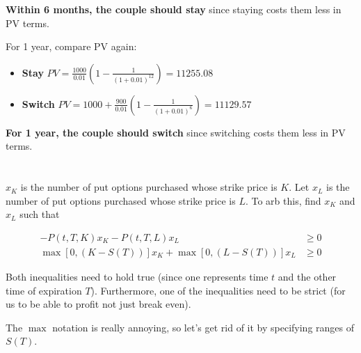 \documentclass[11pt]{scrartcl}
\begin{document}
\textbf{Within 6 months, the couple should stay} since staying costs them less in PV terms.

For 1 year, compare PV again:

\begin{itemize}
\item \textbf{Stay} $PV = \frac{1000}{0.01} \left(1 - \frac{1}{(1+0.01)^12}\right) = 11255.08$
\item \textbf{Switch} $PV = 1000 + \frac{900}{0.01} \left(1 - \frac{1}{(1+0.01)^6} \right) = 11129.57$
\end{itemize}

\textbf{For 1 year, the couple should switch} since switching costs them less in PV terms.

\section{}

$x_K$ is the number of put options purchased whose strike price is $K$. Let $x_L$ is the number of put options purchased whose strike price is $L$. To arb this, find $x_K$ and $x_L$ such that

\begin{align*}
-P(t, T, K)x_K - P(t, T, L)x_L &\geq 0 \\
\max\left[0, (K-S(T))\right]x_K + \max\left[0, (L-S(T))\right]x_L &\geq 0
\end{align*}

Both inequalities need to hold true (since one represents time $t$ and the other time of expiration $T$). Furthermore, one of the inequalities need to be strict (for us to be able to profit not just break even).

The $\max$ notation is really annoying, so let's get rid of it by specifying ranges of $S(T)$.
\end{document}
